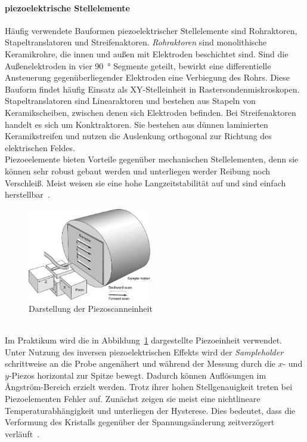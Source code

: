 \documentclass[a4paper,twoside,final]{article}
\begin{document}
\paragraph{piezoelektrische Stellelemente}
Häufig verwendete Bauformen piezoelektrischer Stellelemente sind Rohraktoren, Stapeltranslatoren und Streifenaktoren.
\textit{Rohraktoren} sind monolithische Keramikrohre, die innen und außen mit Elektroden beschichtet sind. Sind die Außenelektroden in vier \SI{90}{\degree} Segmente geteilt,  bewirkt eine differentielle Ansteuerung gegenüberliegender Elektroden eine Verbiegung des Rohrs. Diese Bauform findet häufig Einsatz als XY-Stelleinheit in Rastersondenmiskroskopen.
Stapeltranslatoren sind Linearaktoren und bestehen aus Stapeln von Keramikscheiben, zwischen denen sich Elektroden befinden. Bei Streifenaktoren handelt es sich um Konktraktoren. Sie bestehen aus dünnen laminierten Keramikstreifen und nutzen die Auslenkung orthogonal zur Richtung des elektrischen Feldes.\\
Piezoeelemente bieten Vorteile gegenüber mechanischen Stellelementen, denn sie können sehr robust gebaut werden und unterliegen werder Reibung noch Verschleiß. Meist weisen sie eine hohe Langzeitstabilität auf und sind einfach herstellbar~\cite{Versuchsanleitung}.
\newpage
\begin{figure}
  \centering
  \vspace{-3mm}
  \includegraphics[width=5.4cm]{Bilder/Piezoscanner.pdf}
  \caption{Darstellung der Piezoscanneinheit~\cite{Nanosurf}}
  \label{fig:Piezo}
\end{figure}\\
Im Praktikum wird die in Abbildung~\ref{fig:Piezo} dargestellte Piezoeinheit verwendet. Unter Nutzung des inversen piezoelektrischen Effekts wird der \textit{Sampleholder} schrittweise an die Probe angenähert und während der Messung durch die $x$- und $y$-Piezos horizontal zur Spitze bewegt. Dadurch können Auflösungen im Ångström-Bereich erzielt werden.
Trotz ihrer hohen Stellgenauigkeit treten bei Piezoelementen Fehler auf. Zunächst zeigen sie meist eine nichtlineare Temperaturabhängigkeit und unterliegen der Hysterese. Dies bedeutet, dass die Verformung des Kristalls gegenüber der Spannungsänderung zeitverzögert verläuft~\cite{Versuchsanleitung}.
\end{document}

